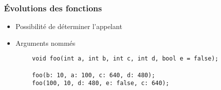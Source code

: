 \documentclass[C++.tex]{subfiles}
\begin{document}
\begin{frame}[fragile]
	\frametitle{Évolutions des fonctions}
	\begin{itemize}
		\item Possibilité de déterminer l'appelant
		\item Arguments nommés
	\end{itemize}

	\begin{verbatim}
		void foo(int a, int b, int c, int d, bool e = false);

		foo(b: 10, a: 100, c: 640, d: 480);
		foo(100, 10, d: 480, e: false, c: 640);
	\end{verbatim}

\end{frame}
\end{document}
